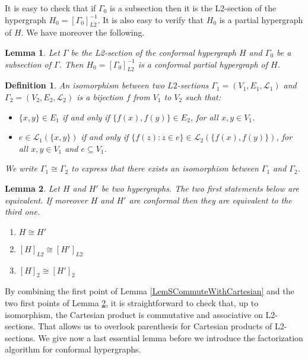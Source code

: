 \documentclass[copyright]{eptcs}
\newtheorem{Def}{Definition}
\newtheorem{Lem}{Lemma}
\newcommand{\mc}[1]{\mathcal{#1}}
\newcommand{\chg}[1]{{#1}}
\begin{document}
It is easy to check that if $\Gamma_0$ is a subsection then it is
the L2-section of the hypergraph $H_0 = [\Gamma_0]^{-1}_{L2}$. It
is also easy to verify that $H_0$ is a partial hypergraph of $H$.
We have moreover the following.

\begin{Lem}\label{LmSubsectionConformal} Let $\Gamma$ be the L2-section of the conformal hypergraph $H$ and $\Gamma_0$ be a subsection of $\Gamma$. Then $H_0 = [\Gamma_0]^{-1}_{L2}$ is a conformal partial hypergraph of $H$.
\end{Lem}



\begin{Def}\label{DfIsomorphismL2Section} An isomorphism between two $L2$-sections $\chg{\Gamma_1} = (\chg{V_1}, \chg{E_1}, \chg{\mc L_1})$ and $\chg{\Gamma_2}=(\chg{V_2}, \chg{E_2}, \chg{\mc L_2})$ is a bijection $f$ from \chg{$V_1$} to \chg{$V_2$} such that:
\begin{itemize}
 \item $\{x,y\} \in \chg{E_1}$ if and only if $\{f(x),f(y)\} \in \chg{E_2}$, for all $x,y \in \chg{V_1}$.
 \item $e \in \chg{\mc L_1}(\{x,y\})$ if and only if $\{f(z) : z \in e \} \in \chg{\mc L_2}(\{f(x),f(y)\})$, for all $x,y \in \chg{V_1}$ and $e \subseteq \chg{V_1}$.
\end{itemize}
We write $\chg{\Gamma_1} \cong \chg{\Gamma_2}$ to express that there exists an isomorphism between $\chg{\Gamma_1}$ and $\chg{\Gamma_2}$.
\end{Def}


\begin{Lem}\label{LmIsoEquivSection} Let $H$ and $H'$ be two hypergraphs. The two first statements below are equivalent. If moreover $H$ and $H'$ are conformal then they are equivalent to the third one.
\begin{enumerate}
 \item $H \cong H'$
 \item $[H]_{L2} \cong [H']_{L2}$
 \item $[H]_{2} \cong [H']_{2}$
\end{enumerate}
\end{Lem}


By combining the first point of Lemma
\ref{LemSCommuteWithCartesian} and the two first points of Lemma
\ref{LmIsoEquivSection}, it is straightforward to check that, up
to isomorphism, the Cartesian product is commutative and
associative on L2-sections. That allows us to overlook parenthesis
for Cartesian products of L2-sections. We give now a last
essential lemma before we introduce the factorization algorithm
for conformal hypergraphs.
\end{document}
